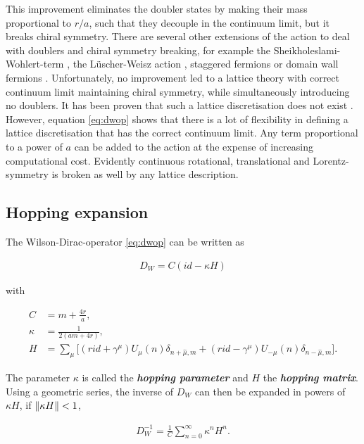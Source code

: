 \documentclass{article}
\theoremstyle{plain} %
\theoremstyle{convention} %
\theoremstyle{remark} %
\def\df#1{\textbf{\textit{#1}}}
\numberwithin{equation}{section}
\begin{document}
This improvement eliminates the doubler states by making their mass proportional to $r/a$, such that they decouple in the continuum limit, but it breaks chiral symmetry. There are several other extensions of the action to deal with doublers and chiral symmetry breaking, for example the Sheikholeslami-Wohlert-term \cite{sheikholeslami1985}, the Lüscher-Weisz action \cite{luscher1985}, staggered fermions \cite{kogut1975} or domain wall fermions \cite{shamir1993}. Unfortunately, no improvement led to a lattice theory with correct continuum limit maintaining chiral symmetry, while simultaneously introducing no doublers. It has been proven that such a lattice discretisation does not exist \cite{nielsen1981}. However, equation \eqref{eq:dwop} shows that there is a lot of flexibility in defining a lattice discretisation that has the correct continuum limit. Any term proportional to a power of $a$ can be added to the action at the expense of increasing computational cost. Evidently continuous rotational, translational and Lorentz-symmetry is broken as well by any lattice description.

\subsection{Hopping expansion}

\label{sec:hopping_expansion}

The Wilson-Dirac-operator \eqref{eq:dwop} can be written as

\begin{align*}
    D_W = C ( id - \kappa H )
\end{align*}

with 

\begin{align*}
    C &= m + \frac{4r}{a}, \\
    \kappa &= \frac{1}{2(a m + 4r)}, \\
    H &= \sum_{\mu} \Big[ (r id + \gamma^{\mu}) U_{\mu}(n) \delta_{n + \hat{\mu},m} + (r id - \gamma^{\mu}) U_{-\mu}(n) \delta_{n - \hat{\mu},m} \Big].
\end{align*}

The parameter $\kappa$ is called the \df{hopping parameter} and $H$ the \df{hopping matrix}. Using a geometric series, the inverse of $D_W$ can then be expanded in powers of $\kappa H$, if $\norm{\kappa H} < 1$,

\begin{align*}
    D_W^{-1} = \frac{1}{C} \sum_{n=0}^{\infty} \kappa^n H^n.
\end{align*}
\end{document}
